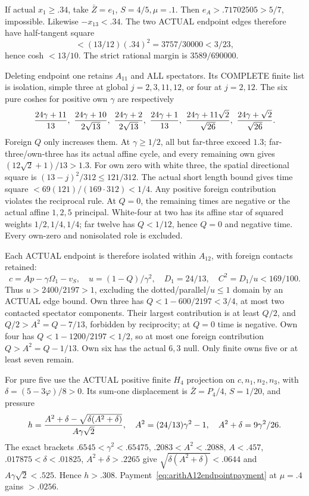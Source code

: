 \documentclass[11pt]{article}
\begin{document}
If actual \(x_1\ge.34\), take \(\bar Z=e_1\),
\(S=4/5,\mu=.1\).
Then \(e_A>.71702505>5/7\), impossible.
Likewise \(-x_{13}<.34\).
The two ACTUAL endpoint edges therefore have
half-tangent square
\[
                 <(13/12)(.34)^2=3757/30000<3/23 ,
\]
hence cosh \(<13/10\).
The strict rational margin is \(3589/690000\).

Deleting endpoint one retains \(A_{11}\) and
ALL spectators.
Its COMPLETE finite list is isolation, simple
three at global \(j=2,3,11,12\), or four at
\(j=2,12\).
The six pure coshes for positive own \(\gamma\)
are respectively
\[
 {24\gamma+11\over13},\
 {24\gamma+10\over2\sqrt{13}},\
 {24\gamma+2\over2\sqrt{13}},\
 {24\gamma+1\over13},\
 {24\gamma+11\sqrt2\over\sqrt{26}},\
 {24\gamma+\sqrt2\over\sqrt{26}} .
\]
Foreign \(Q\) only increases them.
At \(\gamma\ge1/2\), all but far-three exceed
\(1.3\); far-three/own-three has its actual
affine cycle, and every remaining own gives
\((12\sqrt2+1)/13>1.3\).
For own zero with white three, the spatial
directional square is \((13-j)^2/312\le121/312\).
The actual short length bound gives time square
\(<69(121)/(169\cdot312)<1/4\).
Any positive foreign contribution violates
the reciprocal rule.
At \(Q=0\), the remaining times are negative
or the actual affine \(1,2,5\) principal.
White-four at two has its affine star of
squared weights \(1/2,1/4,1/4\);
far twelve has \(Q<1/12\), hence \(Q=0\)
and negative time.
Every own-zero and nonisolated role is excluded.

Each ACTUAL endpoint is therefore isolated
within \(A_{12}\), with foreign contacts retained:
\[
 c=Ap-\gamma\Omega_1-v_S,\quad
 u=(1-Q)/\gamma^2,\quad D_1=24/13,\quad
 C^2=D_1/u<169/100 .
\]
Thus \(u>2400/2197>1\), excluding the
dotted/parallel/\(u\le1\) domain by an ACTUAL
edge bound.
Own three has \(Q<1-600/2197<3/4\),
at most two contacted spectator components.
Their largest contribution is at least \(Q/2\), and
\(Q/2>A^2=Q-7/13\), forbidden by reciprocity;
at \(Q=0\) time is negative.
Own four has \(Q<1-1200/2197<1/2\),
so at most one foreign contribution
\(Q>A^2=Q-1/13\).
Own six has the actual \(6,3\) null.
Only finite owns five or at least seven remain.

For pure five use the ACTUAL positive finite
\(H_4\) projection on \(c,n_1,n_2,n_3\),
with \(\delta=(5-3\varphi)/8>0\).
Its sum-one displacement is \(\bar Z=P_4/4\),
\(S=1/20\), and pressure
\[
 h={A^2+\delta-\sqrt{\delta(A^2+\delta)}
                    \over A\gamma\sqrt2},\quad
 A^2=(24/13)\gamma^2-1,\quad
 A^2+\delta=9\gamma^2/26 .
\]
The exact brackets
\(.6545<\gamma^2<.65475\),
\(.2083<A^2<.2088\), \(A<.457\),
\(.017875<\delta<.01825\),
\(A^2+\delta>.2265\)
give \(\sqrt{\delta(A^2+\delta)}<.0644\)
and \(A\gamma\sqrt2<.525\).
Hence \(h>.308\).
Payment~\eqref{eq:arithA12endpointpayment}
at \(\mu=.4\) gains \(>.0256\).
\end{document}
